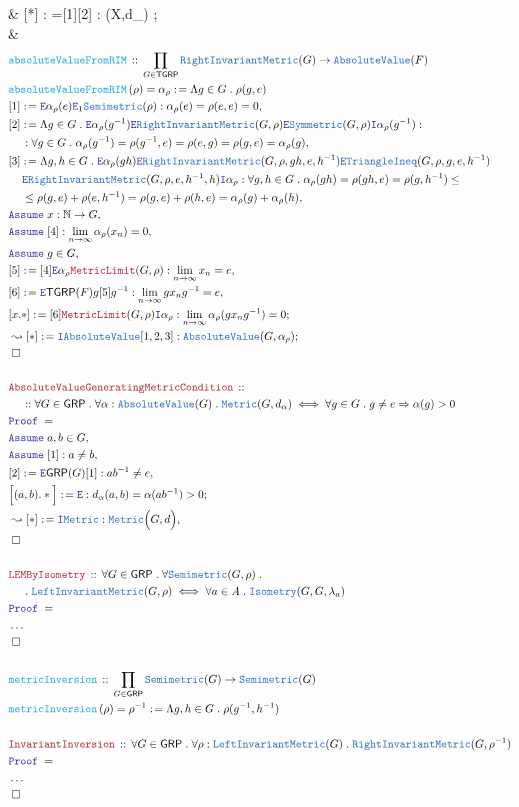 \documentclass[12pt]{scrartcl}
\newcommand{\TYPE}[1]{\textcolor{NavyBlue}{\mathtt{#1}}}
\newcommand{\FUNC}[1]{\textcolor{Cerulean}{\mathtt{#1}}}
\newcommand{\LOGIC}[1]{\textcolor{Blue}{\mathtt{#1}}}
\newcommand{\THM}[1]{\textcolor{Maroon}{\mathtt{#1}}}
\renewcommand{\.}{\; . \;}
\newcommand{\de}{: \kern 0.1pc =}
\newcommand{\Act}[1]{\left( #1 \right)}
\newcommand{\Theorem}[2]{& \THM{#1} \, :: \, #2 \\ & \Proof = \\ }
\newcommand{\DeclareFunc}[2]{& \FUNC{#1} \, :: \, #2 \\}
\newcommand{\DefineNamedFunc}[4]{&  \FUNC{#1}\Act{#2} = #3 \de #4 \\}
\newcommand{\NewLine}{\\ & \kern 1pc}
\newcommand{\Page}[1]{ \begin{align*} #1 \end{align*}   }
\newcommand{\NoProof}{ & \ldots \\ \EndProof}
\newcommand{\Imply}{\Rightarrow}
\newcommand{\Nat}{\mathbb{N} }
\newcommand{\Say}[3]{& #1 \de #2 : #3, \\}
\newcommand{\Conclude}[3]{& #1 \de #2 : #3; \\}
\newcommand{\Derive}[3]{& \leadsto #1 \de #2 : #3, \\}
\newcommand{\DeriveConclude}[3]{& \leadsto #1 \de #2 : #3 ; \\}
\newcommand{\Assume}[2]{& \LOGIC{Assume} \; #1 : #2, \\}
\newcommand{\AssumeIn}[2]{& \LOGIC{Assume} \; #1 \in #2, \\}
\newcommand{\Intro}{\LOGIC{I}}
\newcommand{\Elim}{\LOGIC{E}}
\newcommand{\QED}{\; \square}
\newcommand{\EndProof}{& \QED \\}
\newcommand{\Proof}{\LOGIC{Proof} \; }
\newcommand{\GRP}{\mathsf{GRP}}
\newcommand{\LIM}{\TYPE{LeftInvariantMetric}}
\newcommand{\RIM}{\TYPE{RightInvariantMetric}}
\newcommand{\TGRP}{\mathsf{TGRP}}
\begin{document}
{{	}
	\Conclude{[*]}{\Intro \TGRP [1][2]}
	{
		(X,d_\alpha) \in \TGRP
	}
	\EndProof
}\Page{
	\DeclareFunc{absoluteValueFromRIM}
	{
		\prod_{G \in \TGRP} 
		\RIM(G) \to \TYPE{AbsoluteValue}(F)
	}
	\DefineNamedFunc{absoluteValueFromRIM}{\rho}{\alpha_\rho}
	{
		\Lambda g \in G \. \rho(g,e)
	}
	\Say{[1]}{
		\Elim \alpha_\rho(e)
		\Elim_1 \TYPE{Semimetric}(\rho)  
	}{
		\alpha_\rho(e) = \rho(e,e) = 0
	}
	\Say{[2]}{
		\Lambda g \in G \.
		\Elim \alpha_\rho(g^{-1}) 
		\Elim \RIM(G,\rho)
		\Elim \TYPE{Symmetric}(G,\rho)
		\Intro \alpha_\rho(g^{-1})
	}
	{
		\NewLine :
		\forall g \in G \.		
		\alpha_\rho(g^{-1}) =
		\rho(g^{-1},e) =
		\rho(e,g) =
		\rho(g,e) =
		\alpha_\rho(g) 
	}
	\Say{[3]}{
		\Lambda g,h  \in G \.
		\Elim \alpha_\rho(gh)
		\Elim \RIM(G,\rho,gh,e,h^{-1})
		\Elim \TYPE{TriangleIneq}(G,\rho,g,e,h^{-1})
		\NewLine
		\Elim \RIM(G,\rho,e,h^{-1},h)
		\Intro \alpha_\rho
	}
	{		
		\forall g,h \in G \.
		\alpha_\rho(gh) = 
		\rho(gh,e) =
		\rho(g,h^{-1}) \le \NewLine \le
		\rho(g,e) + \rho(e,h^{-1}) =
		\rho(g,e) + \rho(h,e) = 
		\alpha_\rho(g) + \alpha_\rho(h)
	}
	\Assume{x}{\Nat \to G}
	\Assume{[4]}{\lim_{n \to \infty} \alpha_\rho(x_n) = 0}
	\AssumeIn{g}{G}
	\Say{[5]}{[4]\Elim \alpha_\rho\THM{MetricLimit}(G,\rho)}
	{
		\lim_{n \to \infty} x_n = e
	}
	\Say{[6]}{\Elim \TGRP(F)g[5]g^{-1}}
	{
		\lim_{n \to \infty} gx_ng^{-1} =e
	}
	\Conclude{[x.*]}
	{
		[6]\THM{MetricLimit}(G,\rho) \Intro \alpha_\rho
	}
	{
		\lim_{n \to \infty} \alpha_\rho(gx_ng^{-1}) = 0
	}
	\DeriveConclude{[*]}{\Intro \TYPE{AbsoluteValue}[1,2,3]}
	{
		\TYPE{AbsoluteValue}(G,\alpha_\rho)
	}	
	\EndProof
	\\
	\Theorem{AbsoluteValueGeneratingMetricCondition}
	{
		\NewLine ::		
		\forall G \in \GRP \.
		\forall \alpha : \TYPE{AbsoluteValue}(G) \.
		\TYPE{Metric}(G,d_\alpha)
		\iff 
		\forall g \in G \. 
		g \neq e \Imply  \alpha(g) > 0
	}
	\AssumeIn{a,b}{G}
	\Assume{[1]}{a \neq b}
	\Say{[2]}{\Elim \GRP(G)[1]}{ab^{-1} \neq e }
	\Conclude{\Big[(a,b).*\Big]}{\Elim }
	{
		d_\alpha(a,b) =
		\alpha(ab^{-1}) > 0
	}
	\Derive{[*]}{\Intro \TYPE{Metric}}
	{
		\TYPE{Metric}\Big( G, d \Big)	
	}
	\EndProof
	\\
	\Theorem{LEMByIsometry}
	{
		\forall G \in \GRP \.
		\forall \TYPE{Semimetric}(G,\rho) \. \NewLine \.
		\LIM(G,\rho)
		\iff
		\forall a \in A \.
		\TYPE{Isometry}(G,G,\lambda_a)
	}
	\NoProof
	\\
	\DeclareFunc{metricInversion}
	{
		\prod_{G \in \GRP} \TYPE{Semimetric}(G) \to \TYPE{Semimetric}(G)
	}
	\DefineNamedFunc{metricInversion}{\rho}
	{\rho^{-1}}
	{
		\Lambda g,h \in G \. \rho(g^{-1},h^{-1}) 
	}
	\\
	\Theorem{InvariantInversion}
	{
		\forall G \in \GRP \.
		\forall \rho : \LIM(G) \.
		\RIM(G,\rho^{-1})
	}
	\NoProof
}
\newpage
\end{document}
